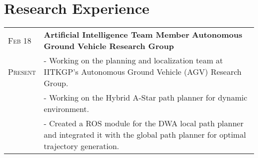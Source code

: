\documentclass[a4paper,10pt]{extarticle} %
\begin{document}
  \section{\textcolor{primary}{Research Experience}}
  \begin{tabularx}{\linewidth}{ l | X }
  \textsc{Feb 18} & \textbf{Artificial Intelligence Team Member} \hfill\textbf{Autonomous Ground Vehicle Research Group}\\
  \textsc{Present} & {- Working on the planning and localization team at IITKGP's Autonomous Ground Vehicle (AGV) Research Group.}\\
  & {- Working on the Hybrid A-Star path planner for dynamic environment.}\\
  & {- Created a ROS module for the DWA local path planner and integrated it with the global path planner for optimal trajectory generation.}
  \end{tabularx}
  
  
\end{document}
